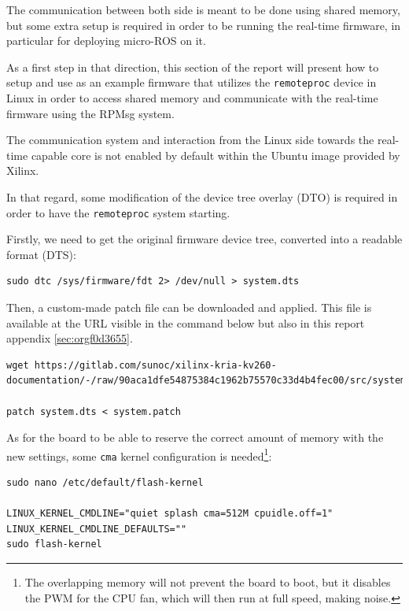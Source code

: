 \documentclass[10pt]{article}
\begin{document}
The communication between both side is meant to be done using shared memory, but
some extra setup is required in order to be running the real-time firmware, in particular
for deploying micro-ROS on it.

As a first step in that direction, this section of the report
will present how to setup and use as an example firmware that utilizes the
\texttt{remoteproc} device in Linux in order to access shared memory
and communicate with the real-time firmware using the RPMsg system.

The communication system and interaction from the Linux side towards the real-time capable core
is not enabled by default within the Ubuntu image provided by Xilinx.

In that regard, some modification of the device tree overlay (DTO) is required in order to have
the \texttt{remoteproc} system starting.

Firstly, we need to get the original firmware device tree, converted
into a readable format (DTS):

\begin{verbatim}
sudo dtc /sys/firmware/fdt 2> /dev/null > system.dts
\end{verbatim}

Then, a custom-made patch file can be downloaded and applied.
This file is available at the URL visible in the command below
but also in this report appendix \ref{sec:orgf0d3655}.

\begin{verbatim}
wget https://gitlab.com/sunoc/xilinx-kria-kv260-documentation/-/raw/90aca1dfe54875384c1962b75570c33d4b4fec00/src/system.patch

patch system.dts < system.patch
\end{verbatim}


As for the board to be able to reserve the correct amount of memory with the new settings, some
\texttt{cma} kernel configuration is needed\footnote{The overlapping memory will not prevent the board to boot,
but it disables the PWM for the CPU fan, which will then run at full speed, making noise.}:

\begin{verbatim}
sudo nano /etc/default/flash-kernel

LINUX_KERNEL_CMDLINE="quiet splash cma=512M cpuidle.off=1"
LINUX_KERNEL_CMDLINE_DEFAULTS=""
sudo flash-kernel
\end{verbatim}
\end{document}
